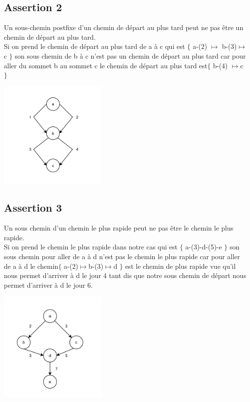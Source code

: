 \documentclass{article}
\begin{document}
\subsection*{Assertion 2} Un sous-chemin postfixe  d’un chemin de départ au plus tard peut ne pas être un chemin de départ au plus tard.
\\Si on prend le chemin de départ au plus tard de a à c qui est $\lbrace$ a-(2) $  \mapsto$ b-(3)$\mapsto$c $\rbrace$ son sous chemin de b à c n’est pas un chemin de départ au plus tard car pour aller du sommet b au sommet c le chemin de départ au plus tard est$\lbrace$ b-(4) $\mapsto$c $\rbrace$
\\
\begin{center}
\includegraphics[width=0.4\textwidth]{qd.png}
\end{center}



\subsection*{Assertion 3 } Un sous chemin d’un chemin le plus rapide peut ne pas être le chemin le plus rapide.
\\Si on prend le chemin le plus rapide dans notre cas qui est $\lbrace$ a-(3)-d-(5)-e $\rbrace$ son sous chemin pour aller de a à d n’est pas le chemin le plus rapide car pour aller de a à d le chemin$\lbrace$ a-(2)$\mapsto$b-(3)$\mapsto$d $\rbrace$ est le chemin de plus rapide vue qu’il nous permet d’arriver à d le jour 4 tant dis que notre sous chemin de départ nous permet d’arriver à d le jour 6.
\\
\begin{center}
\includegraphics[width=0.4\textwidth]{qt.png}
\end{center}
\end{document}
